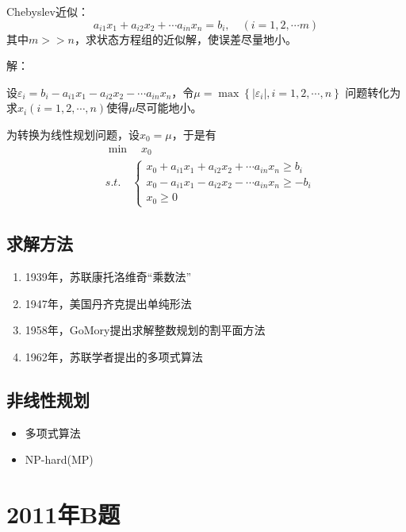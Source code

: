 \begin{example}
Chebyslev近似：
\begin{equation*}
a_{i1}x_1+a_{i2}x_2+\cdots a_{in}x_n=b_i,\quad (i=1,2,\cdots m)
\end{equation*}
其中$m>>n$，求状态方程组的近似解，使误差尽量地小。
\end{example}
{\heiti 解：}\par
设$\varepsilon_i=b_i-a_{i1}x_1-a_{i2}x_2-\cdots a_{in}x_n$，令$\mu =\max\left\{|\varepsilon_i|,i=1,2,\cdots,n\right\}$
问题转化为求$x_i(i=1,2,\cdots,n)$使得$\mu$尽可能地小。\par
为转换为线性规划问题，设$x_0=\mu$，于是有
\begin{align*}
& \min\quad x_0 \\
& s.t.\quad
    \begin{cases}
    x_0+a_{i1}x_1+a_{i2}x_2+\cdots a_{in}x_n\geq b_i \\
    x_0-a_{i1}x_1-a_{i2}x_2-\cdots a_{in}x_n\geq -b_i \\
    x_0 \geq 0
    \end{cases}
\end{align*}
\subsection{求解方法}
\begin{enumerate}
\item 1939年，苏联康托洛维奇“乘数法”
\item 1947年，美国丹齐克提出单纯形法
\item 1958年，GoMory提出求解整数规划的割平面方法
\item 1962年，苏联学者提出的多项式算法
\end{enumerate}
\subsection{非线性规划}
\begin{itemize}
\item 多项式算法
\item NP-hard(MP)
\end{itemize}
\newpage
\section{2011年B题}
